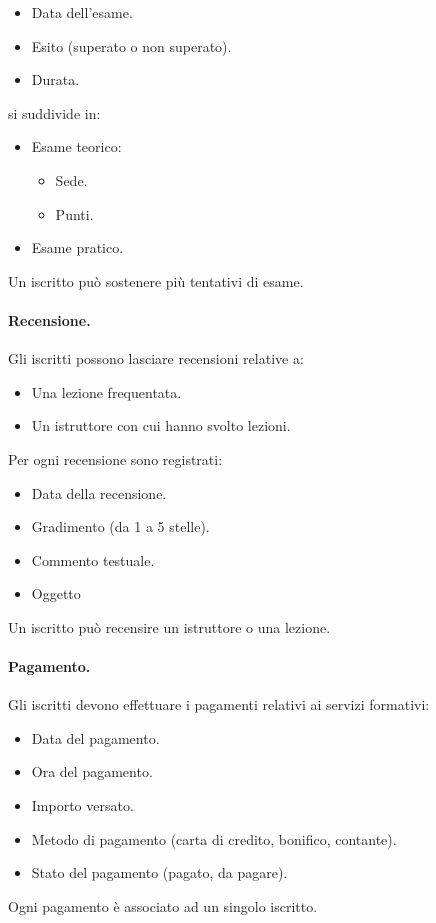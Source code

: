 \documentclass[10pt,twoside]{article}
\begin{document}
{    \begin{itemize}
            \item Data dell’esame.
            \item Esito (superato o non superato).
            \item Durata.
    \end{itemize}

    si suddivide in: 

    \begin{itemize}
        \item Esame teorico:
        \begin{itemize}
            \item Sede.
            \item Punti.
        \end{itemize}
        \item Esame pratico.
    \end{itemize}

    Un iscritto può sostenere più tentativi di esame. 


    \paragraph{Recensione.}
    Gli iscritti possono lasciare recensioni relative a:

    \begin{itemize}
        \item Una lezione frequentata.
        \item Un istruttore con cui hanno svolto lezioni.
    \end{itemize}

    Per ogni recensione sono registrati:

    \begin{itemize}
        \item Data della recensione.
        \item Gradimento (da 1 a 5 stelle).
        \item Commento testuale.
        \item Oggetto 
    \end{itemize}

    Un iscritto può recensire un istruttore o una lezione.


    \paragraph{Pagamento.}
    Gli iscritti devono effettuare i pagamenti relativi ai servizi formativi:

    \begin{itemize}
        \item Data del pagamento.
        \item Ora del pagamento.
        \item Importo versato.
        \item Metodo di pagamento (carta di credito, bonifico, contante).
        \item Stato del pagamento (pagato, da pagare).
    \end{itemize}

    Ogni pagamento è associato ad un singolo iscritto.

}
\end{document}
